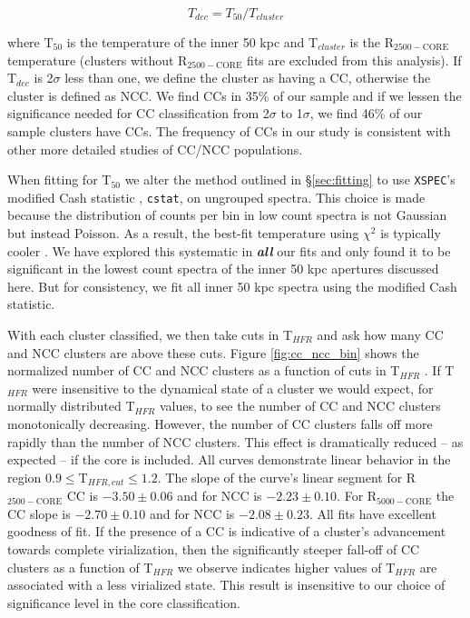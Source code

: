 \documentclass{emulateapj}
\newcommand{\tf}{T$_{HFR}$ }
\newcommand{\rtwf}{R$_{2500-\text{CORE}}$ }
\newcommand{\rfif}{R$_{5000-\text{CORE}}$ }
\begin{document}
\begin{equation}
T_{dec} = T_{50}/T_{cluster}
\end{equation}

where T$_{50}$ is the temperature of the inner 50 kpc
and T$_{cluster}$ is the \rtwf temperature
(clusters without \rtwf fits are excluded from this
analysis). If T$_{dec}$ is 2$\sigma$ less than one, we define the
cluster as having a CC, otherwise the cluster is defined as NCC. We
find CCs in 35\% of our sample and if we lessen the significance
needed for CC classification from 2$\sigma$ to 1$\sigma$, we find 46\%
of our sample clusters have CCs. The frequency of CCs in our study is
consistent with other more detailed studies of CC/NCC populations.

When fitting for T$_{50}$ we alter the method outlined
in \S\ref{sec:fitting} to use {\tt XSPEC}'s modified Cash statistic
\citep{1979ApJ...228..939C}, {\tt cstat}, on ungrouped
spectra. This choice is made because the distribution of counts per
bin in low count spectra is not Gaussian but instead
Poisson. As a result, the best-fit temperature using $\chi^2$ is
typically cooler \citep{1989ApJ...342.1207N, 2007A&A...462..429B}. We
have explored this systematic in {\bfseries\em{all}} our fits and
only found it to be significant in the lowest count spectra of the
inner 50 kpc apertures discussed here. But for consistency, we fit all
inner 50 kpc spectra using the modified Cash statistic.

With each cluster classified, we then take cuts in \tf 
and ask how many CC and NCC clusters are above these cuts. 
Figure \ref{fig:cc_ncc_bin} shows the normalized number of CC and NCC
clusters as a function of cuts in \tf. If \tf were insensitive to
the dynamical state of a cluster we would expect, for normally
distributed \tf values, to see the number of CC and NCC clusters
monotonically decreasing. However, the number of CC clusters falls off
more rapidly than the number of NCC clusters. This effect
is dramatically reduced -- as expected -- if the core is included. All
curves demonstrate linear behavior in the region $0.9 \leq
$T$_{HFR,cut} \leq 1.2$. The slope of the curve's linear segment for
\rtwf CC is $-3.50\pm 0.06$ and for NCC is $-2.23\pm
0.10$. For \rfif the CC slope is $-2.70\pm 0.10$ and
for NCC is $-2.08\pm 0.23$. All fits have excellent goodness of fit.
If the presence of a CC is indicative of a cluster's advancement
towards complete virialization, then the significantly steeper
fall-off of CC clusters as a function of \tf we observe indicates
higher values of \tf are associated with a less virialized state. This
result is insensitive to our choice of significance level in the core
classification.
\end{document}
